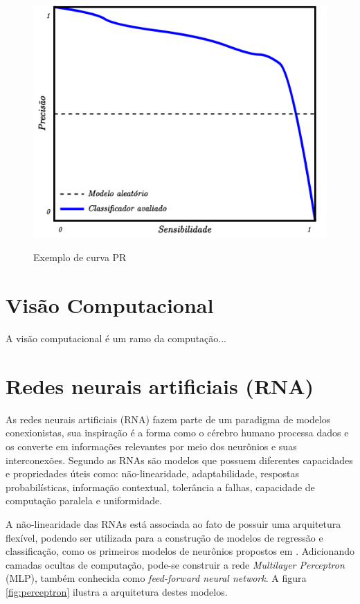 \begin{figure}[htbp]
	\centering
	\caption{Exemplo de curva PR}
		\includegraphics[scale=.25]{imagens/prcurve.png}
	\label{fig:prcurve}
\end{figure}

\section{Visão Computacional}

A visão computacional é um ramo da computação...

\section{Redes neurais artificiais (RNA)}

As redes neurais artificiais (RNA) fazem parte de um paradigma de modelos conexionistas, sua inspiração é a forma como o cérebro humano processa dados e os converte em informações relevantes por meio dos neurônios e suas interconexões. Segundo  as RNAs são modelos que possuem diferentes capacidades e propriedades úteis como: não-linearidade, adaptabilidade, respostas probabilísticas, informação contextual, tolerância a falhas, capacidade de computação paralela e uniformidade.

A não-linearidade das RNAs está associada ao fato de possuir uma arquitetura flexível, podendo ser utilizada para a construção de modelos de regressão e classificação, como os primeiros modelos de neurônios propostos em . Adicionando camadas ocultas de computação, pode-se construir a rede \textit{Multilayer Perceptron} (MLP), também conhecida como \textit{feed-forward neural network}. A figura \ref{fig:perceptron} ilustra a arquitetura destes modelos.

